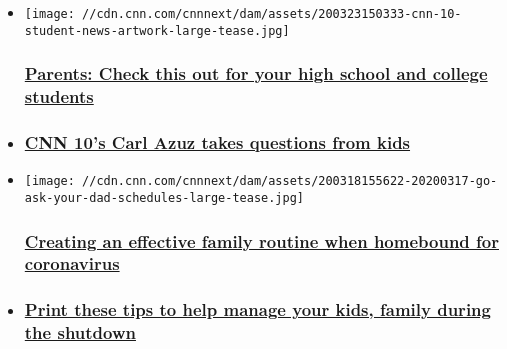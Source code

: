\begin{itemize}
\item
  \href{https://www.cnn.com/cnn10}{}

  \texttt{[image: //cdn.cnn.com/cnnnext/dam/assets/200323150333-cnn-10-student-news-artwork-large-tease.jpg]}

  \hypertarget{parents-check-this-out-for-your-high-school-and-college-students}{%
  \subsubsection{\texorpdfstring{\href{https://www.cnn.com/cnn10}{Parents:
  Check this out for your high school and college
  students}}{Parents: Check this out for your high school and college students}}\label{parents-check-this-out-for-your-high-school-and-college-students}}
\item
  \hypertarget{cnn-10s-carl-azuz-takes-questions-from-kids-}{%
  \subsubsection{\texorpdfstring{\href{/2020/05/21/health/carl-azuz-cnn10-pandemic-questions-wellness/index.html}{CNN
  10's Carl Azuz takes questions from kids
  }}{CNN 10's Carl Azuz takes questions from kids }}\label{cnn-10s-carl-azuz-takes-questions-from-kids-}}
\end{itemize}

\begin{itemize}
\item
  \href{/2020/03/19/health/schedules-parenting-go-ask-your-dad-wellness/index.html}{}

  \texttt{[image: //cdn.cnn.com/cnnnext/dam/assets/200318155622-20200317-go-ask-your-dad-schedules-large-tease.jpg]}

  \hypertarget{creating-an-effective-family-routine-when-homebound-for-coronavirus-}{%
  \subsubsection{\texorpdfstring{\href{/2020/03/19/health/schedules-parenting-go-ask-your-dad-wellness/index.html}{Creating
  an effective family routine when homebound for coronavirus
  }}{Creating an effective family routine when homebound for coronavirus }}\label{creating-an-effective-family-routine-when-homebound-for-coronavirus-}}
\item
  \hypertarget{print-these-tips-to-help-manage-your-kids-family-during-the-shutdown-}{%
  \subsubsection{\texorpdfstring{\href{https://www.cnn.com/interactive/2020/health/coronavirus-tipsheets/parenting/index.html}{Print
  these tips to help manage your kids, family during the shutdown
  }}{Print these tips to help manage your kids, family during the shutdown }}\label{print-these-tips-to-help-manage-your-kids-family-during-the-shutdown-}}
\end{itemize}

